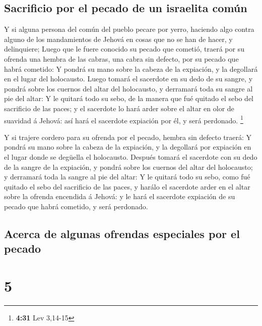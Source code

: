 \hypertarget{sacrificio-por-el-pecado-de-un-israelita-comuxfan}{%
\subsection{Sacrificio por el pecado de un israelita
común}\label{sacrificio-por-el-pecado-de-un-israelita-comuxfan}}

 Y si alguna persona del común del pueblo pecare por
yerro, haciendo algo contra alguno de los mandamientos de Jehová en
cosas que no se han de hacer, y delinquiere;  Luego que
le fuere conocido su pecado que cometió, traerá por su ofrenda una
hembra de las cabras, una cabra sin defecto, por su pecado que habrá
cometido:  Y pondrá su mano sobre la cabeza de la
expiación, y la degollará en el lugar del holocausto. 
Luego tomará el sacerdote en su dedo de su sangre, y pondrá sobre los
cuernos del altar del holocausto, y derramará toda su sangre al pie del
altar:  Y le quitará todo su sebo, de la manera que fué
quitado el sebo del sacrificio de las paces; y el sacerdote lo hará
arder sobre el altar en olor de suavidad á Jehová: así hará el sacerdote
expiación por él, y será perdonado. \footnote{\textbf{4:31} Lev 3,14-15}

 Y si trajere cordero para su ofrenda por el pecado,
hembra sin defecto traerá:  Y pondrá su mano sobre la
cabeza de la expiación, y la degollará por expiación en el lugar donde
se degüella el holocausto.  Después tomará el sacerdote
con su dedo de la sangre de la expiación, y pondrá sobre los cuernos del
altar del holocausto; y derramará toda la sangre al pie del altar:
 Y le quitará todo su sebo, como fué quitado el sebo del
sacrificio de las paces, y harálo el sacerdote arder en el altar sobre
la ofrenda encendida á Jehová: y le hará el sacerdote expiación de su
pecado que habrá cometido, y será perdonado.

\hypertarget{acerca-de-algunas-ofrendas-especiales-por-el-pecado}{%
\subsection{Acerca de algunas ofrendas especiales por el
pecado}\label{acerca-de-algunas-ofrendas-especiales-por-el-pecado}}

\hypertarget{section-4}{%
\section{5}\label{section-4}}

